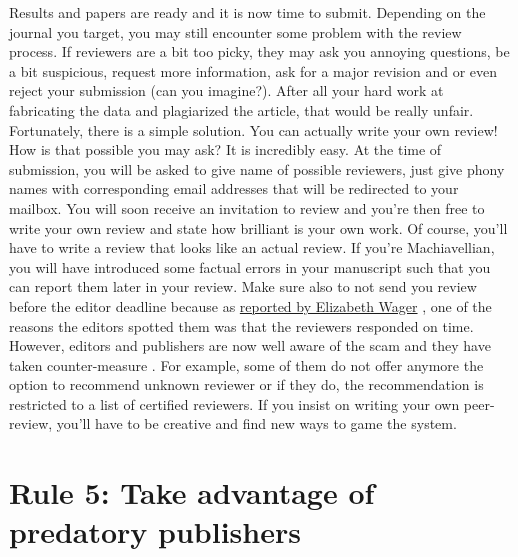\documentclass[a4paper,10pt,onecolumn]{article}
\begin{document}
Results and papers are ready and it is now time to submit. Depending on the
journal you target, you may still encounter some problem with the review
process. If reviewers are a bit too picky, they may ask you annoying questions,
be a bit suspicious, request more information, ask for a major revision and or
even reject your submission (can you imagine?). After all your hard work at
fabricating the data and plagiarized the article, that would be really
unfair. Fortunately, there is a simple solution. You can actually write your
own review! How is that possible you may ask? It is incredibly easy. At the
time of submission, you will be asked to give name of possible reviewers, just
give phony names with corresponding email addresses that will be redirected to
your mailbox. You will soon receive an invitation to review and you're then
free to write your own review and state how brilliant is your own work. Of
course, you'll have to write a review that looks like an actual review. If
you're Machiavellian, you will have introduced some factual errors in your
manuscript such that you can report them later in your review. Make sure also
to not send you review before the editor deadline because as
\href{https://arstechnica.com/science/2017/04/107-cancer-papers-retracted-due-to-peer-review-fraud/}{reported
  by Elizabeth Wager} \citep{stigbrand:2017}, one of the reasons the editors
spotted them was that the reviewers responded on time. However, editors and
publishers are now well aware of the scam \citep{ferguson:2014} and they have
taken counter-measure \citep{haug:2015}. For example, some of them do not offer
anymore the option to recommend unknown reviewer or if they do, the
recommendation is restricted to a list of certified reviewers. If you insist on
writing your own peer-review, you'll have to be creative and find new ways to
game the system.


\section*{Rule 5: Take advantage of predatory publishers}
\end{document}
